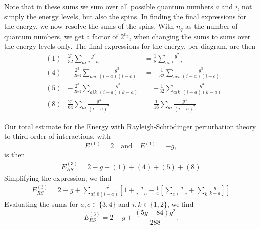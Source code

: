 Note that in these sums we sum over all possible quantum numbers $a$ and $i$, not simply the energy levels, but also the spins.
In finding the final expressions for the energy, we now resolve the sums of the spins.
With $n_q$ as the number of quantum numbers, we get a factor of $2^{n_q}$, when changing the sums to sums over the energy levels only.
The final expressions for the energy, per diagram, are then
\begin{align*}
    & (1) & \frac{2^2}{32} \sum_{ai} \frac{g^2}{i - a} &= \frac{1}{8} \sum_{ai} \frac{g^2}{i - a} \\
    & (4) & -\frac{2^3}{256} \sum_{aci} \frac{g^3}{(i-a)(i-c)} &= -\frac{1}{32} \sum_{aci} \frac{g^3}{(i-a)(i-c)} \\
    & (5) & -\frac{2^3}{256} \sum_{aik} \frac{g^3}{(i-a)(k-a)} &= -\frac{1}{32} \sum_{aik} \frac{g^3}{(i-a)(k-a)} \\
    & (8) & \frac{2^2}{64} \sum_{ai} \frac{g^3}{(i - a)^2} &= \frac{1}{16} \sum_{ai} \frac{g^3}{(i - a)^2} %
\end{align*}

Our total estimate for the Energy with Rayleigh-Schr\"odinger perturbation theory to third order of interactions, with
\begin{equation*}
    E^{(0)} = 2 \quad \text{and} \quad E^{(1)} = - g,
\end{equation*}
is then
\begin{align*}
    E_{RS}^{(3)} = 2 - g + (1) + (4) + (5) + (8)
\end{align*}
Simplifying the expression, we find
\begin{align*}
    E_{RS}^{(3)} = 2 - g + \sum_{ai} \frac{g^2}{8(i-a)} \left[
        1 + \frac{g}{i-a} - \frac{1}{4} \left[ \sum_c \frac{g}{i-c} + \sum_k \frac{g}{k-a} \right]
    \right]
\end{align*}
Evaluating the sums for $a,c \in \{3, 4\}$ and $i,k \in \{1, 2\}$, we find
\begin{equation*}
    E_{RS}^{(3)} = 2 - g + \frac{(5g - 84)g^2}{288}.
\end{equation*}

